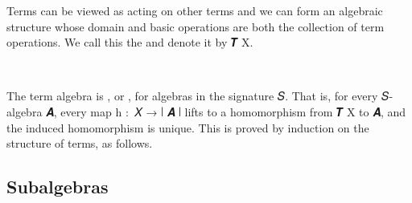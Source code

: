 \documentclass[a4paper,UKenglish,cleveref,autoref,thm-restate]{lipics-v2021}
\begin{document}
Terms can be viewed as acting on other terms and we can form an algebraic structure whose domain and basic operations are both the collection of term operations. We call this the  and denote it by \af 𝑻 \ab X.
\ccpad
\begin{code}%
\>[0]\AgdaSpace{}%
\AgdaSymbol{:}\AgdaSpace{}%
\AgdaSymbol{\{}\AgdaSpace{}%
\AgdaSymbol{:}\AgdaSpace{}%
\AgdaSymbol{\}(}\AgdaSpace{}%
\AgdaSymbol{:}\AgdaSpace{}%
\AgdaSpace{}%
\AgdaSymbol{)}\AgdaSpace{}%
\AgdaSpace{}%
\AgdaSpace{}%
\AgdaSymbol{(}\AgdaSpace{}%
\AgdaSpace{}%
\AgdaSpace{}%
\AgdaSpace{}%
\AgdaSpace{}%
\AgdaSymbol{)}\AgdaSpace{}%
\<%
\\
\>[0]\AgdaSpace{}%
\AgdaSymbol{\{}\AgdaSymbol{\}}\AgdaSpace{}%
\AgdaSpace{}%
\AgdaSymbol{=}\AgdaSpace{}%
\AgdaSymbol{\{}\AgdaSymbol{\}\{}\AgdaSymbol{\}}\AgdaSpace{}%
\AgdaOperator{\AgdaInductiveConstructor{,}}\AgdaSpace{}%
\<%
\end{code}
\ccpad
The term algebra is , or , for algebras in the signature 𝑆. That is, for every 𝑆-algebra 𝑨, every map \ab h \as :~\ab 𝑋 \as → \af ∣ \ab 𝑨 \af ∣ lifts to a homomorphism from \af 𝑻 \ab X to \ab 𝑨, and the induced homomorphism is unique. This is proved by induction on the structure of terms, as follows.
\ccpad
\begin{code}%

\end{code}











\subsection{Subalgebras}\label{ssec:subalgebras}
\end{document}
